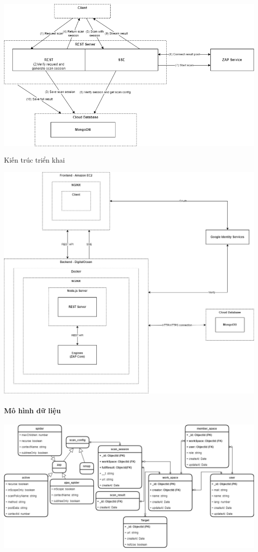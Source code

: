 \includegraphics[width=\textwidth]{images/diagram/diagram_04112023/Scan Process.png}

\newpage
Kiến trúc triển khai
\vspace{3cm}

\includegraphics[width=\textwidth]{images/diagram/diagram_04112023/ZAPOP Architecture.png}

\paragraph{Mô hình dữ liệu}
\vspace{1cm}

\includegraphics[width=\textwidth]{images/diagram/diagram_25102022/Database Diagram.png}


